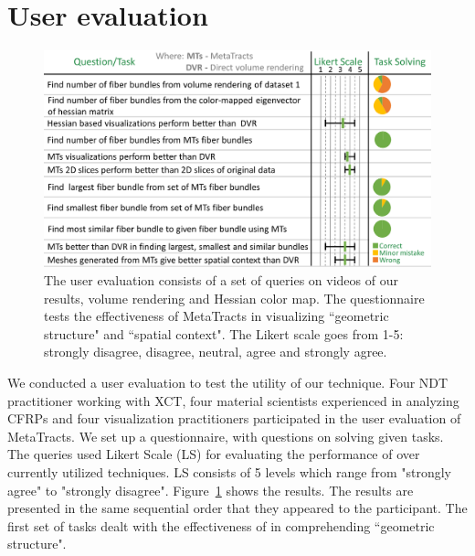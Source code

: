 \section{User evaluation}\label{sec:user_eval}
\begin{figure}[tb]
	\centering
	\includegraphics[width=\linewidth,  trim = 0mm 00mm 0mm 0mm, clip]{images/usereval_AMA.eps}
	\caption{The user evaluation consists of a set of queries on videos of our results, volume rendering and Hessian color map. The questionnaire tests the effectiveness of MetaTracts in visualizing ``geometric structure" and ``spatial context". The Likert scale goes from 1-5: strongly disagree, disagree, neutral, agree and strongly agree. }
	\label{fig:userstudy}
\end{figure}
We conducted a user evaluation to test the utility of our technique. Four NDT practitioner working with XCT, four material scientists experienced in analyzing CFRPs and four visualization practitioners participated in the user evaluation of MetaTracts. We set up a questionnaire, with questions on solving given tasks. The queries used Likert Scale (LS) for evaluating the performance of \mt over currently utilized techniques. 
LS consists of 5 levels which range from "strongly agree" to "strongly disagree". Figure~\ref{fig:userstudy} shows the results. The results are presented in the same sequential order that they appeared to the participant. The first set of tasks dealt with the effectiveness of \mt in comprehending ``geometric structure".

